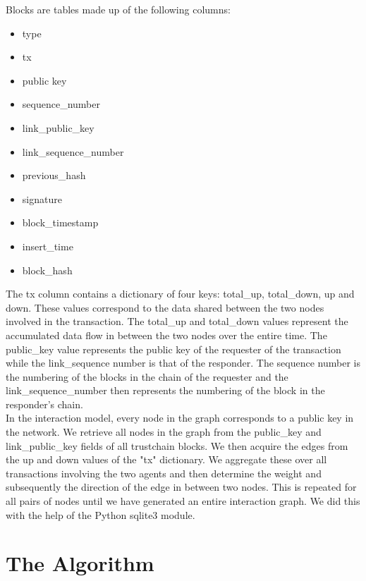 \documentclass[sigconf]{acmart}
\theoremstyle{definition}
\begin{document}
\noindent Blocks are tables made up of the following columns:
\begin{itemize}
\item type
\item tx
\item public key
\item sequence\_{}number
\item link\_{}public\_{}key
\item link\_{}sequence\_{}number
\item previous\_{}hash
\item signature
\item block\_{}timestamp
\item insert\_{}time
\item block\_{}hash
\end{itemize}

\noindent The tx column contains a dictionary of four keys: total\_{}up, total\_{}down, up and down. These values correspond to the data shared between the two nodes involved in the transaction. The total\_{}up and total\_{}down values represent the accumulated data flow in between the two nodes over the entire time. The public\_{}key value represents the public key of the requester of the transaction while the link\_{}sequence number is that of the responder. The sequence number is the numbering of the blocks in the chain of the requester and the link\_{}sequence\_{}number then represents the numbering of the block in the responder's chain. \vspace{1em}\\

\noindent In the interaction model, every node in the graph corresponds to a public key in the network. We retrieve all nodes in the graph from the public\_{}key and link\_{}public\_{}key fields of all trustchain blocks. We then acquire the edges from the up and down values of the "tx" dictionary. We aggregate these over all transactions involving the two agents and then determine the weight and subsequently the direction of the edge in between two nodes. This is repeated for all pairs of nodes until we have generated an entire interaction graph. We did this with the help of the Python sqlite3 module. 
\section{The Algorithm}
\label{sec:TheAlgorithm}
\end{document}
